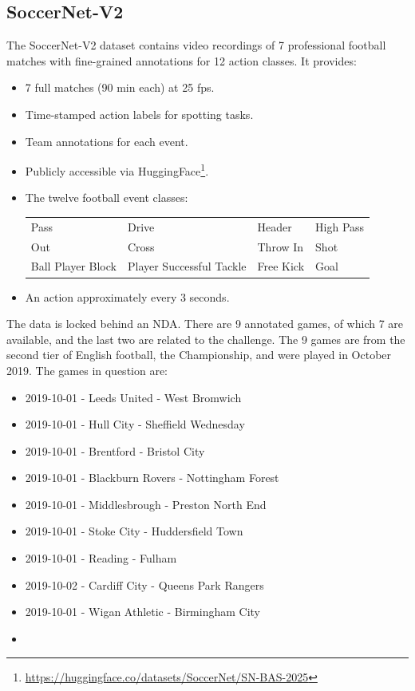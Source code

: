\subsection{SoccerNet-V2}

The SoccerNet-V2 dataset \cite{deliege_soccernet-v2_dataset_2021} contains video recordings of 7 professional football matches with fine-grained annotations for 12 action classes. It provides:
\begin{itemize}
    \item 7 full matches (90 min each) at 25 fps.
    \item Time-stamped action labels for spotting tasks.
    \item Team annotations for each event.
    \item Publicly accessible via HuggingFace\footnote{\url{https://huggingface.co/datasets/SoccerNet/SN-BAS-2025}}.
    \item The twelve football event classes:
        \begin{center}
            \begin{tabular}{llll}
                Pass & Drive & Header & High Pass \\
                Out & Cross & Throw In & Shot \\
                Ball Player Block & Player Successful Tackle & Free Kick & Goal
            \end{tabular}
        \end{center}
    \item An action approximately every 3 seconds. 
\end{itemize}

The data is locked behind an NDA. There are 9 annotated games, of which 7 are available, and the last two are related to the challenge. The 9 games are from the second tier of English football, the Championship, and were played in October 2019. The games in question are: 

\begin{itemize}
    \item 2019-10-01 - Leeds United - West Bromwich
    \item 2019-10-01 - Hull City - Sheffield Wednesday
    \item 2019-10-01 - Brentford - Bristol City
    \item 2019-10-01 - Blackburn Rovers - Nottingham Forest
    \item 2019-10-01 - Middlesbrough - Preston North End
    \item 2019-10-01 - Stoke City - Huddersfield Town
    \item 2019-10-01 - Reading - Fulham
    \item 2019-10-02 - Cardiff City - Queens Park Rangers
    \item 2019-10-01 - Wigan Athletic - Birmingham City
    \item 
\end{itemize}


